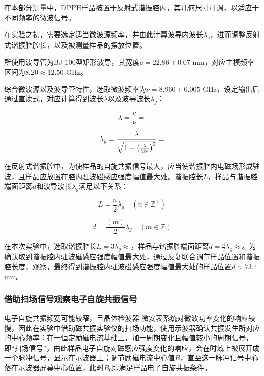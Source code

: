 \documentclass{thuemp}
\begin{document}
在本部分测量中，DPPH样品被置于反射式谐振腔内，其几何尺寸可调，以适应于不同频率的微波信号。

在实验之初，需要选定适当微波源频率，并由此计算波导内波长$\lambda_g$，进而调整反射式谐振腔腔长，以及被测量样品的摆放位置。

所使用波导管为BJ-100型矩形波导，其宽度$a=22.86\pm0.07$ \si{\milli\meter}，对应主模频率区间为$8.20 \approx 12.50$ \si{\giga\hertz}。

综合微波源以及波导管特性，选取微波频率为$\nu  = 8.960 \pm 0.005$ \si{\giga\hertz}，设定输出后通过直读式，对应计算得到波长$\lambda$以及波导波长$\lambda_g$：

\begin{equation}
\lambda = \frac{c}{\nu} = 
\end{equation}

\begin{equation}
\lambda_g = \frac{\lambda}{\sqrt{1 - \left(\frac{\lambda}{\2a}\right)^2}} = 
\end{equation}

在反射式谐振腔中，为使样品的自旋共振信号最大，应当使谐振腔内电磁场形成驻波，且样品应放置在腔内驻波磁感应强度幅值最大处。谐振腔长$L$，样品与谐振腔端面距离$d$和波导波长$\lambda_g$满足以下关系：

\begin{equation}
L = \frac{n}{2}\lambda_g \quad (n \in \mathbb{Z}^+)
\end{equation}

\begin{equation}
d = \frac{(m)}{2}\lambda_g \quad (m \in \mathbb{Z})
\end{equation}

在本次实验中，选取谐振腔长$L=3\lambda_g\approx$，样品与谐振腔端面距离$d=\frac{3}{2}\lambda_g\approx$。为确认取到谐振腔内驻波磁感应强度幅值最大处，通过反复联合调节样品位置和谐振腔长度，观察，最终得到谐振腔内驻波磁感应强度幅值最大处的样品位置$d \approx 73.4 $\si{\milli\meter}。

\subsubsection{借助扫场信号观察电子自旋共振信号}

电子自旋共振频宽可能较窄，且晶体检波器-微安表系统对微波功率变化的响应较慢，因此在实验中借助磁共振实验仪的扫场功能，使用示波器确认共振发生所对应的中心频率：在一恒定励磁电流基础上，加一周期变化且幅值较小的周期信号，即“扫场信号”，由此样品电子自旋对磁感应强度变化的响应，会在时域上被展开成一个脉冲信号，显示在示波器上；调节励磁电流中心值$B$，直至这一脉冲信号中心落在示波器屏幕中心位置，此时$B_0$即满足样品电子自旋共振条件。
\end{document}
